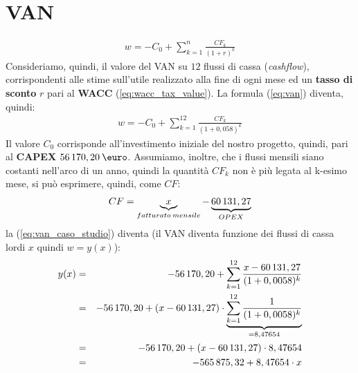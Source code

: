 \section[VAN]{VAN}
	\begin{equation}
	\label{eq:van}
	\begin{split}
 		w = - C_0 + \sum_{k=1}^n \frac{CF_k}{(1+r)^k}
	\end{split}
	\end{equation}
	Consideriamo, quindi, il valore del \ac{VAN} su $12$ flussi di cassa (\textit{cashflow}), corrispondenti alle stime sull'utile realizzato alla fine di ogni mese ed un \textbf{tasso di sconto} $r$ pari al \textbf{\ac{WACC}} (\ref{eq:wacc_tax_value}).\newline
	La formula (\ref{eq:van}) diventa, quindi:	
	\begin{equation}
	\label{eq:van_caso_studio}
	\begin{split}
 		w = - C_0 + \sum_{k=1}^{12} \frac{CF_k}{(1+0,058)^k}
	\end{split}
	\end{equation}	
	Il valore $C_0$ corrisponde all'investimento iniziale del nostro progetto, quindi, pari al \textbf{CAPEX} $ 56\thinspace 170,20 \: \mbox{\euro}$.
	Assumiamo, inoltre, che i flussi mensili siano costanti nell'arco di un anno, quindi la quantità $CF_k$ non è più legata al k-esimo mese, si può esprimere, quindi, come $CF$:
	\begin{equation}
	\label{eq:flussi_cassa_mensili}
	\begin{split}
 		CF = \underbrace{x}_{fatturato \: mensile} - \underbrace{60\thinspace 131,27}_{OPEX}
	\end{split}
	\end{equation}	  	
la (\ref{eq:van_caso_studio}) diventa (il VAN diventa funzione dei flussi di cassa lordi $x$ quindi $w = y(x)$):	
	\begin{eqnarray}
	\label{eq:van_caso_studio_2}
 		y(x) & = & - 56\thinspace 170,20 + \sum_{k=1}^{12} \frac{x - 60\thinspace 131,27}{(1+0,0058)^k} \nonumber \\
 		 & = & -56\thinspace 170,20 + (x - 60\thinspace 131,27) \cdot \underbrace{\sum_{k=1}^{12} \frac{1} {(1+0,0058)^{k}}}_{{}=8,47654} \nonumber \\
 		 & = & -56\thinspace 170,20 + (x - 60\thinspace 131,27) \cdot 8,47654 \nonumber \\
 		 & = & -565\thinspace 875,32 + 8,47654 \cdot x 		
	\end{eqnarray}  		

